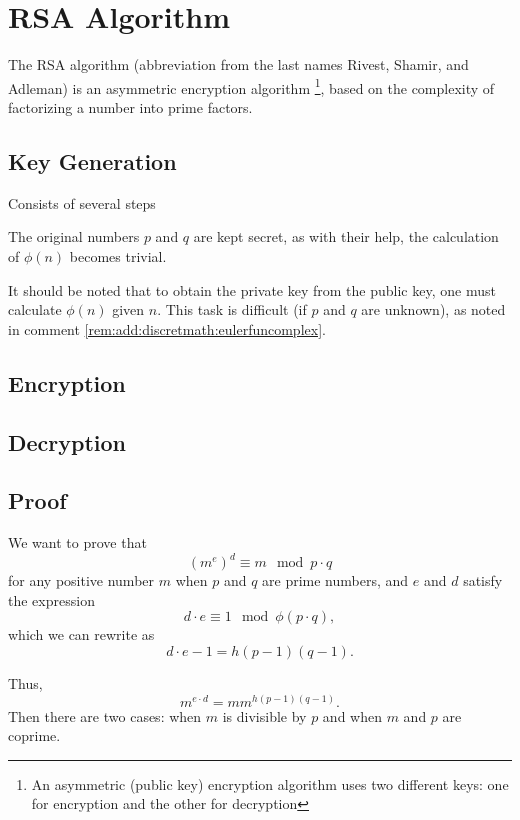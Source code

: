 \section{RSA Algorithm}
\label{AddRSA}
The RSA algorithm (abbreviation from the last names Rivest, Shamir, and Adleman) is 
an asymmetric encryption algorithm
\footnote{An asymmetric (public key) encryption algorithm uses two different keys: one for encryption and the other for decryption},  
based on the complexity of factorizing a number into prime factors.  

\subsection{Key Generation}
Consists of several steps


The original numbers $p$ and $q$ are kept secret, as with their help,
the calculation of $\phi(n)$ becomes trivial.

It should be noted that to obtain the private key from the public key,
one must calculate $\phi(n)$ given $n$. This task is difficult (if $p$ and $q$ are unknown), as noted in comment \ref{rem:add:discretmath:eulerfuncomplex}. 



\subsection{Encryption}


\subsection{Decryption}


\subsection{Proof}
We want to prove that 
\[
\left(m^e\right)^d \equiv m \mod{p \cdot q}
\]
for any positive number $m$ when $p$ and $q$ are prime numbers, and $e$
and $d$ satisfy the expression
\[
d \cdot e \equiv 1 \mod{\phi\left(p \cdot q\right)},
\]
which we can rewrite as
\[
d \cdot e - 1 = h \left(p - 1\right)\left(q - 1\right).
\]

Thus,
\[
m^{e\cdot d} =m m^{h \left(p - 1\right)\left(q - 1\right)}.
\]
Then there are two cases: when $m$ is divisible by $p$ and when $m$ and $p$
are coprime.

